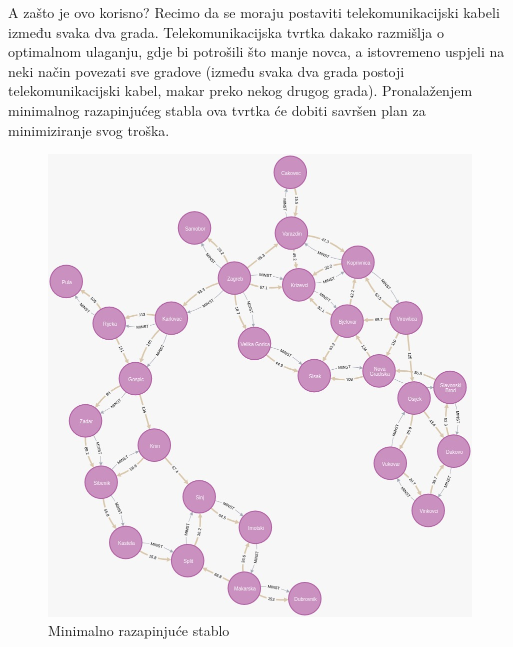 \documentclass[10pt]{scrartcl}
\begin{document}
A zašto je ovo korisno? Recimo da se moraju postaviti telekomunikacijski kabeli između svaka dva grada. Telekomunikacijska tvrtka dakako razmišlja o optimalnom ulaganju, gdje bi potrošili što manje novca, a istovremeno uspjeli na neki način povezati sve gradove (između svaka dva grada postoji telekomunikacijski kabel, makar preko nekog drugog grada). Pronalaženjem minimalnog razapinjućeg stabla ova tvrtka će dobiti savršen plan za minimiziranje svog troška. 

\begin{figure}[H]
\caption{Minimalno razapinjuće stablo}
\begin{center}
\includegraphics[scale=0.4]{MST}
\end{center}
\end{figure}
\end{document}
